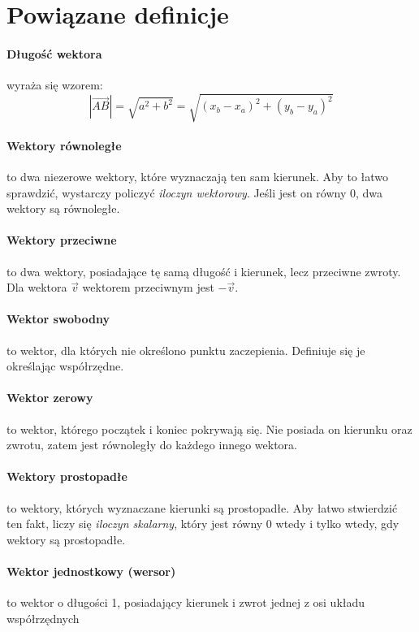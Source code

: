 \documentclass [a4paper, 12pt, oneside]{article}
\begin{document}
\section*{Powiązane definicje}

\paragraph{Długość wektora} wyraża się wzorem:
\[
    \left|\overrightarrow{AB}\right| = \sqrt{a^2 + b^2} = \sqrt{\left(x_b - x_a\right)^2 + \left(y_b - y_a\right)^2}
\]

\paragraph{Wektory równoległe} to dwa niezerowe wektory, które wyznaczają ten sam kierunek. Aby to łatwo sprawdzić, wystarczy policzyć \emph{iloczyn wektorowy}. Jeśli jest on równy 0, dwa wektory są równoległe.

\paragraph{Wektory przeciwne} to dwa wektory, posiadające tę samą długość i kierunek, lecz przeciwne zwroty. Dla wektora $\overrightarrow{v}$ wektorem przeciwnym jest $-\overrightarrow{v}$.

\paragraph{Wektor swobodny} to wektor, dla których nie określono punktu zaczepienia. Definiuje się je określając współrzędne.

\paragraph{Wektor zerowy} to wektor, którego początek i koniec pokrywają się. Nie posiada on kierunku oraz zwrotu, zatem jest równoległy do każdego innego wektora.

\paragraph{Wektory prostopadłe} to wektory, których wyznaczane kierunki są prostopadłe. Aby łatwo stwierdzić ten fakt, liczy się \emph{iloczyn skalarny}, który jest równy 0 wtedy i tylko wtedy, gdy wektory są prostopadłe.

\paragraph{Wektor jednostkowy (wersor)} to wektor o długości 1, posiadający kierunek i zwrot jednej z osi układu współrzędnych
\end{document}
